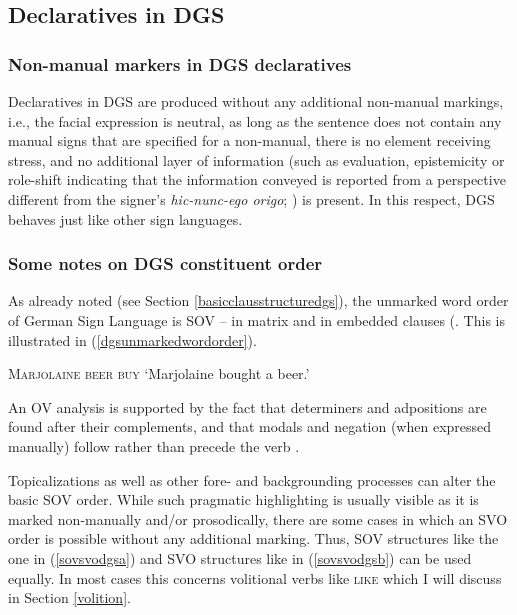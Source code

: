 \subsection{Declaratives in DGS}
\subsubsection{Non-manual markers in DGS declaratives}

Declaratives in DGS are produced without any additional non-manual markings, i.e., the facial expression is neutral, as long as the sentence does not contain any manual signs that are specified for a non-manual, there is no element receiving stress, and no additional layer of information (such as evaluation, epistemicity or role-shift indicating that the information conveyed is reported from a perspective different from the signer's \textit{hic-nunc-ego origo}; \citealt{buhler1934}) is present. In this respect, DGS behaves just like other sign languages. 

\subsubsection{Some notes on DGS constituent order}
As already noted (see Section \ref{basicclausstructuredgs}), the unmarked word order of German Sign Language is SOV -- in matrix and in embedded clauses (\citealt{keller1998aspekte, steinbach2013satztypen}. This is illustrated in (\ref{dgsunmarkedwordorder}).

\begin{exe}
\ex \textsc{Marjolaine beer buy}
\glt `Marjolaine bought a beer.'\label{dgsunmarkedwordorder}
\end{exe}

\noindent An OV analysis is supported by the fact that determiners and adpositions are found after their complements, and that modals and negation (when expressed manually) follow rather than precede the verb \citep{pfauquer2007syntaxofnegationandmodals,bross2017scope}.


Topicalizations as well as other fore- and backgrounding processes can alter the basic SOV order. While such pragmatic highlighting is usually visible as it is marked non-manually and/or prosodically, there are some cases in which an SVO order is possible without any additional marking. Thus, SOV structures like the one in (\ref{sovsvodgsa}) and SVO structures like in (\ref{sovsvodgsb}) can be used equally. In most cases this concerns volitional verbs like \textsc{like} which I will discuss in Section \ref{volition}.

